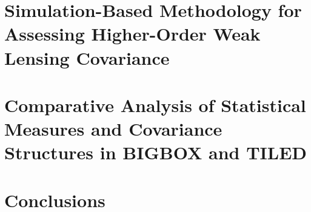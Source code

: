 \documentclass[11pt,a4paper]{ipmu}
\begin{document}
\chapter{Simulation-Based Methodology for Assessing Higher-Order Weak Lensing Covariance}
\label{chap:methods}
\minitoc 


\chapter{Comparative Analysis of Statistical Measures and Covariance Structures in BIGBOX and TILED}
\label{chap:results}
\minitoc 


\chapter{Conclusions}
\label{chap:conclusions}


\appendix  %


\backmatter


\end{document}
